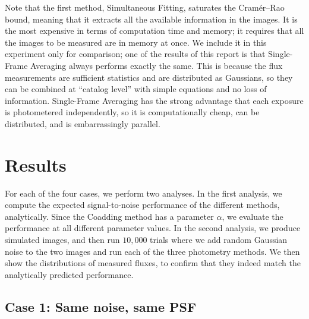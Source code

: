 \documentclass[a4paper,11pt]{article}
\begin{document}
Note that the first method, Simultaneous Fitting, saturates the
Cram\'er--Rao bound, meaning that it extracts all the available
information in the images.  It is the most expensive in terms of
computation time and memory; it requires that all the images to be
measured are in memory at once.  We include it in this experiment only
for comparison; one of the results of this report is that Single-Frame
Averaging always performs exactly the same.  This is because the flux
measurements are sufficient statistics and are distributed as
Gaussians, so they can be combined at ``catalog level'' with simple
equations and no loss of information.  Single-Frame Averaging has the
strong advantage that each exposure is photometered independently, so
it is computationally cheap, can be distributed, and is embarrassingly
parallel.

\newpage

\section{Results}

For each of the four cases, we perform two analyses.  In the first
analysis, we compute the expected signal-to-noise performance of the
different methods, analytically.  Since the Coadding method has a
parameter $\alpha$, we evaluate the performance at all different
parameter values.  In the second analysis, we produce simulated
images, and then run $10,000$ trials where we add random Gaussian
noise to the two images and run each of the three photometry methods.
We then show the distributions of measured fluxes, to confirm that
they indeed match the analytically predicted performance.

\subsection*{Case 1: Same noise, same PSF}
\end{document}
